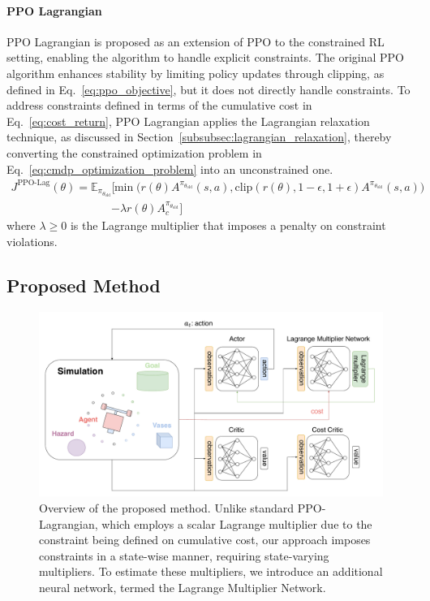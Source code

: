 \paragraph{PPO Lagrangian}

PPO Lagrangian is proposed as an extension of PPO to the constrained RL setting, enabling the algorithm to handle explicit constraints.
The original PPO algorithm enhances stability by limiting policy updates through clipping, as defined in Eq.~\ref{eq:ppo_objective}, but it does not directly handle constraints.
To address constraints defined in terms of the cumulative cost in Eq.~\ref{eq:cost_return}, PPO Lagrangian applies the Lagrangian relaxation technique, as discussed in Section~\ref{subsubsec:lagrangian_relaxation}, thereby converting the constrained optimization problem in Eq.~\ref{eq:cmdp_optimization_problem} into an unconstrained one.
\begin{equation} \label{eq:ppo_lagrangian_objective}
    \begin{aligned} J^{\text{PPO-Lag}}(\theta)
        = \mathbb{E}_{\pi_{\theta_\text{old}}} \Big[ &\min \big( r(\theta) A^{\pi_{\theta_\text{old}}}(s, a), \text{clip}(r(\theta), 1 - \epsilon, 1 + \epsilon) A^{\pi_{\theta_\text{old}}}(s, a) \big)
        \\ &- \lambda r(\theta) A^{\pi_{\theta_\text{old}}}_c \Big]
    \end{aligned}
\end{equation}
where $\lambda \geq 0$ is the Lagrange multiplier that imposes a penalty on constraint violations.



\subsection{Proposed Method}



\begin{figure}[h]
    \centering

    \includegraphics[width=0.8\linewidth]{figure/ppo_lagnet.pdf}
    \caption{Overview of the proposed method.
            Unlike standard PPO-Lagrangian, which employs a scalar Lagrange multiplier due to the constraint being defined on cumulative cost, our approach imposes constraints in a state-wise manner, requiring state-varying multipliers. 
            To estimate these multipliers, we introduce an additional neural network, termed the Lagrange Multiplier Network.}
    \label{fig:ppo_lagnet}
\end{figure}

